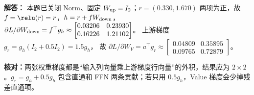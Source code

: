 \begin{enumerate}[label={},leftmargin=4.8em,itemsep=4pt]
\textbf{解答：} 本题已关闭 Norm、固定 $W_{\rm up}=I_2$；$r=(0.330,1.670)$ 两项为正，故 $f=\relu(r)=r$，$h=r+fW_{\rm down}$，
$\partial L/\partial W_{\rm down}=f^\top g_h
\approx\begin{bmatrix}0.03206&0.23930\\0.16226&1.21102\end{bmatrix}$。
上游梯度 $g_r=g_h(I_2+0.5I_2)=1.5g_h$，
故 $\partial L/\partial W_V=a^\top g_r
\approx\begin{bmatrix}0.04809&0.35895\\0.09765&0.72879\end{bmatrix}$。\par\textbf{核对：}两张权重梯度都是“输入列向量乘上游梯度行向量”的外积，结果应为 $2\times2$。$g_r=g_h+0.5g_h$ 包含直通和 FFN 两条贡献；若只用 $0.5g_h$，Value 梯度会少掉残差直通项。
\end{enumerate}
